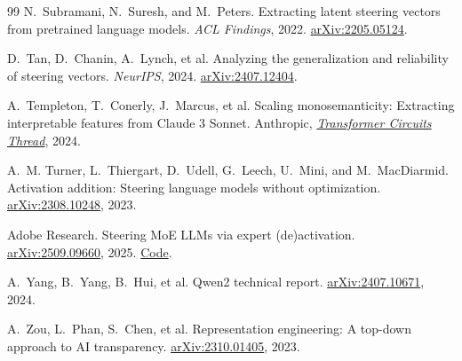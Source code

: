 \documentclass[11pt]{article}
\begin{document}
\begin{thebibliography}{99}
N.~Subramani, N.~Suresh, and M.~Peters.
\newblock Extracting latent steering vectors from pretrained language models.
\newblock \textit{ACL Findings}, 2022.
\href{https://arxiv.org/abs/2205.05124}{arXiv:2205.05124}.

D.~Tan, D.~Chanin, A.~Lynch, et al.
\newblock Analyzing the generalization and reliability of steering vectors.
\newblock \textit{NeurIPS}, 2024.
\href{https://arxiv.org/abs/2407.12404}{arXiv:2407.12404}.

A.~Templeton, T.~Conerly, J.~Marcus, et al.
\newblock Scaling monosemanticity: Extracting interpretable features from Claude 3 Sonnet.
\newblock Anthropic,
\href{https://transformer-circuits.pub/2024/scaling-monosemanticity/}{\textit{Transformer Circuits Thread}}, 2024.

A.~M. Turner, L.~Thiergart, D.~Udell, G.~Leech, U.~Mini, and M.~MacDiarmid.
\newblock Activation addition: Steering language models without optimization.
\newblock \href{https://arxiv.org/abs/2308.10248}{arXiv:2308.10248}, 2023.

Adobe Research.
\newblock Steering MoE LLMs via expert (de)activation.
\newblock \href{https://arxiv.org/abs/2509.09660}{arXiv:2509.09660}, 2025.
\href{https://github.com/adobe-research/SteerMoE}{Code}.

A.~Yang, B.~Yang, B.~Hui, et al.
\newblock Qwen2 technical report.
\newblock \href{https://arxiv.org/abs/2407.10671}{arXiv:2407.10671}, 2024.

A.~Zou, L.~Phan, S.~Chen, et al.
\newblock Representation engineering: A top-down approach to AI transparency.
\newblock \href{https://arxiv.org/abs/2310.01405}{arXiv:2310.01405}, 2023.

\end{thebibliography}
\end{document}
